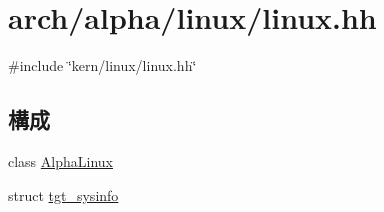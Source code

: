 \hypertarget{arch_2alpha_2linux_2linux_8hh}{
\section{arch/alpha/linux/linux.hh}
\label{arch_2alpha_2linux_2linux_8hh}
}
{\ttfamily \#include \char`\"{}kern/linux/linux.hh\char`\"{}}\par
\subsection*{構成}
\begin{DoxyCompactItemize}
\item 
class \hyperlink{classAlphaLinux}{AlphaLinux}
\item 
struct \hyperlink{structAlphaLinux_1_1tgt__sysinfo}{tgt\_\-sysinfo}
\end{DoxyCompactItemize}
